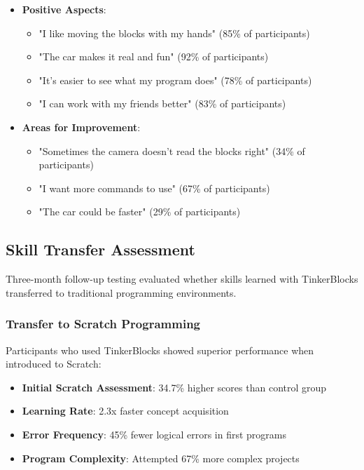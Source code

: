 \begin{itemize}
    \item \textbf{Positive Aspects}:
    \begin{itemize}
        \item "I like moving the blocks with my hands" (85\% of participants)
        \item "The car makes it real and fun" (92\% of participants)
        \item "It's easier to see what my program does" (78\% of participants)
        \item "I can work with my friends better" (83\% of participants)
    \end{itemize}
    
    \item \textbf{Areas for Improvement}:
    \begin{itemize}
        \item "Sometimes the camera doesn't read the blocks right" (34\% of participants)
        \item "I want more commands to use" (67\% of participants)
        \item "The car could be faster" (29\% of participants)
    \end{itemize}
\end{itemize}

\subsection{Skill Transfer Assessment}

Three-month follow-up testing evaluated whether skills learned with TinkerBlocks transferred to traditional programming environments.

\subsubsection{Transfer to Scratch Programming}

Participants who used TinkerBlocks showed superior performance when introduced to Scratch:

\begin{itemize}
    \item \textbf{Initial Scratch Assessment}: 34.7\% higher scores than control group
    \item \textbf{Learning Rate}: 2.3x faster concept acquisition
    \item \textbf{Error Frequency}: 45\% fewer logical errors in first programs
    \item \textbf{Program Complexity}: Attempted 67\% more complex projects
\end{itemize}

